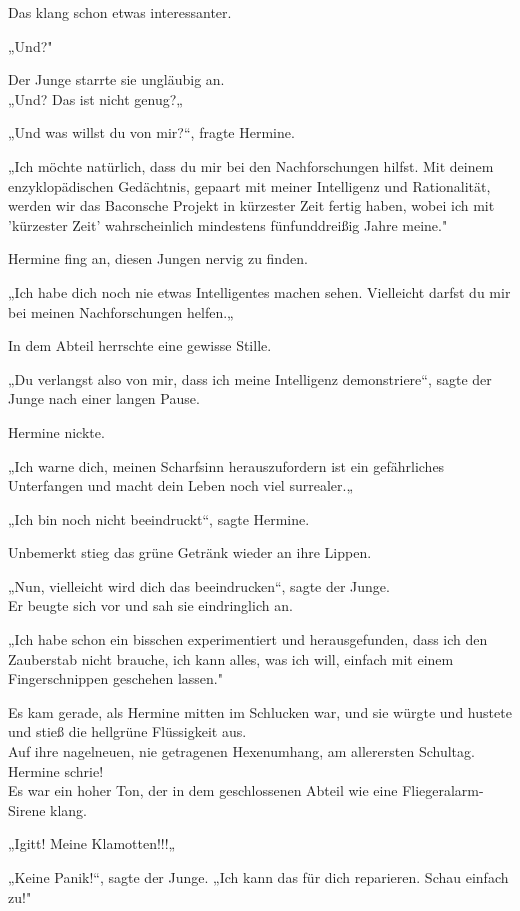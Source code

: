 {Das klang schon etwas interessanter.

„Und?"

Der Junge starrte sie ungläubig an.\\ „Und? Das ist nicht genug?„

„Und was willst du von mir?“, fragte Hermine.

„Ich möchte natürlich, dass du mir bei den Nachforschungen hilfst. Mit deinem enzyklopädischen Gedächtnis, gepaart mit meiner Intelligenz und Rationalität, werden wir das Baconsche Projekt in kürzester Zeit fertig haben, wobei ich mit 'kürzester Zeit' wahrscheinlich mindestens fünfunddreißig Jahre meine."

Hermine fing an, diesen Jungen nervig zu finden.

„Ich habe dich noch nie etwas Intelligentes machen sehen. Vielleicht darfst du mir bei meinen Nachforschungen helfen.„

In dem Abteil herrschte eine gewisse Stille.

„Du verlangst also von mir, dass ich meine Intelligenz demonstriere“, sagte der Junge nach einer langen Pause.

Hermine nickte.

„Ich warne dich, meinen Scharfsinn herauszufordern ist ein gefährliches Unterfangen und macht dein Leben noch viel surrealer.„

„Ich bin noch nicht beeindruckt“, sagte Hermine.

Unbemerkt stieg das grüne Getränk wieder an ihre Lippen.

„Nun, vielleicht wird dich das beeindrucken“, sagte der Junge.\\ Er beugte sich vor und sah sie eindringlich an.

„Ich habe schon ein bisschen experimentiert und herausgefunden, dass ich den Zauberstab nicht brauche, ich kann alles, was ich will, einfach mit einem Fingerschnippen geschehen lassen."

Es kam gerade, als Hermine mitten im Schlucken war, und sie würgte und hustete und stieß die hellgrüne Flüssigkeit aus.\\ Auf ihre nagelneuen, nie getragenen Hexenumhang, am allerersten Schultag. Hermine schrie!\\ Es war ein hoher Ton, der in dem geschlossenen Abteil wie eine Fliegeralarm-Sirene klang.

„Igitt! Meine Klamotten!!!„

„Keine Panik!“, sagte der Junge. „Ich kann das für dich reparieren. Schau einfach zu!"

}
